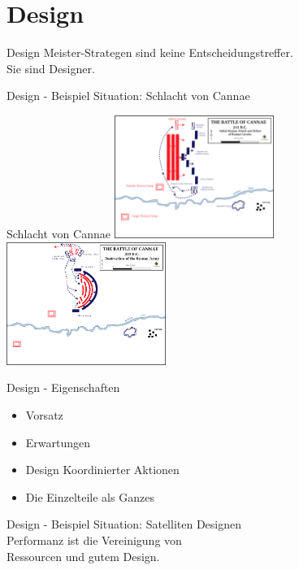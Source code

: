 \section{Design}


\begin{frame}[c]{Design}
    \large
    Meister-Strategen sind keine Entscheidungstreffer. \\
    \pause \LARGE
    Sie sind Designer.
\end{frame}


\begin{frame}[c]{Design - Beispiel}
    \Large
    Situation: Schlacht von Cannae
\end{frame}


\begin{frame}[c]{Schlacht von Cannae}
    \includegraphics[height=4cm]{strategy/Initial_Roman_attack.png}
    \pause
    \includegraphics[height=4cm]{strategy/Battle_cannae_destruction.png}
\end{frame}

\begin{frame}[c]{Design - Eigenschaften}
    \large
    \begin{itemize}
        \item Vorsatz
            \pause
        \item Erwartungen
            \pause
        \item Design Koordinierter Aktionen
            \pause
        \item Die Einzelteile als Ganzes
    \end{itemize}
\end{frame}


\begin{frame}[c]{Design - Beispiel}
    \Large
    Situation: Satelliten Designen \\
    \pause
    Performanz ist die Vereinigung von \\
    Ressourcen und gutem Design.
\end{frame}


